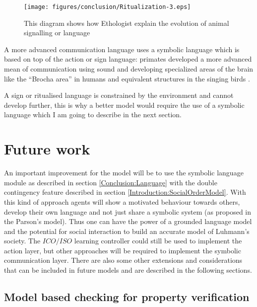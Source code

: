 \begin{figure}[htbp]
\begin{center}
\texttt{[image: figures/conclusion/Ritualization-3.eps]}
\end{center}
\vspace*{4pt}
\caption[Ritualization model]{This diagram shows how Ethologist explain
the evolution of animal signalling or language 
\label{fig:conclusion:ritualizationmodel}}
\end{figure}

A more advanced communication language uses a symbolic language which is based
on top of the action or sign language:
primates developed a more advanced mean of communication using sound and developing
 specialized areas of the brain like the ``Brocha area'' in humans and equivalent
structures in the singing birds \citep{FoxP2Gene:Nature:2001,FOXP2Identification:2005}.

A sign or ritualised language is constrained by the environment and cannot develop further, 
this is why a better model would require the use of a symbolic language which I am
going to describe in the next section.



\section{Future work \label{Conclusion:FutureWork}}

An important improvement for the model will be to use the symbolic language
module as described in section \ref{Conclusion:Language} with the double contingency
feature described in section \ref{Introduction:SocialOrderModel}.
With this kind of approach agents will show a motivated behaviour towards others, 
develop their own language and not just share a symbolic system (as proposed in the Parson's model).
Thus one can have the power of a grounded language model and the
potential for social interaction to build an accurate model of Luhmann's society.
The $ICO/ISO$ learning controller could still be used to implement the action layer,
but other approaches will be required to implement the symbolic communication layer.
There are also some other extensions and considerations that can be included in future
models and are described in the following sections.


\subsection{Model based checking for property verification \label{Conclusion:ModelCheck}}

